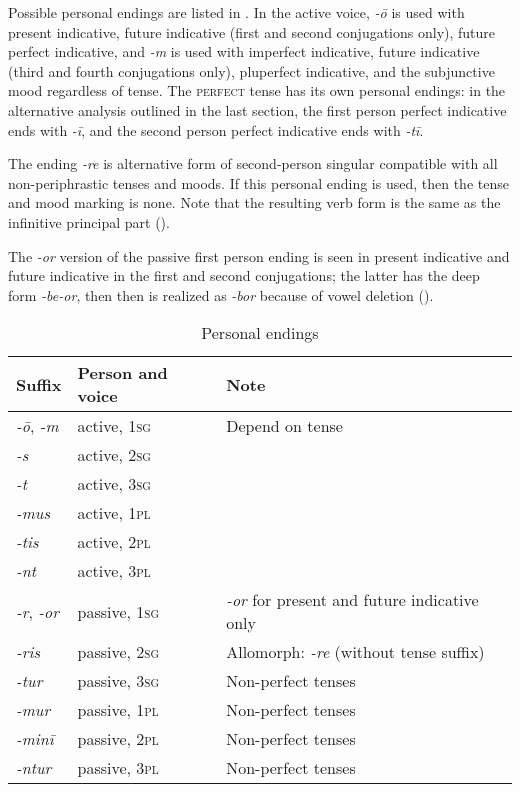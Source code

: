 \documentclass[a4paper, oneside, 12pt]{report}
\newcommand{\form}[1]{\emph{#1}}
\newcommand*{\category}[1]{\textsc{#1}}
\begin{document}
Possible personal endings are listed in .
In the active voice, 
\form{-\={o}} is used with present indicative, 
future indicative (first and second conjugations only), 
future perfect indicative,
and \form{-m} is used with imperfect indicative, 
future indicative (third and fourth conjugations only),
pluperfect indicative,
and the subjunctive mood regardless of tense.
The \category{perfect} tense has its own personal endings:
in the alternative analysis outlined in the last section,
the first person perfect indicative ends with \form{-ī},
and the second person perfect indicative ends with \form{-tī}.

The ending \form{-re} is alternative form of second-person singular compatible 
with all non-periphrastic tenses and moods.
If this personal ending is used, then the tense and mood marking is none.
Note that the resulting verb form is the same as the infinitive principal part
().

The \form{-or} version of the passive first person ending 
is seen in present indicative and future indicative
in the first and second conjugations;
the latter has the deep form \form{-be-or},
then then is realized as \form{-bor} because of vowel deletion 
().

\begin{table}[H]
    \caption{Personal endings}
    \label{tbl:personal-ending}
    \centering
    \begin{tabular}{lll}
        \toprule
        Suffix & Person and voice & Note \\
        \midrule
        \form{-\={o}}, \form{-m} & active, \category{1sg} & Depend on tense \\ 
        \form{-s}                & active, \category{2sg} & \\ 
        \form{-t}                & active, \category{3sg} & \\ 
        \form{-mus}              & active, \category{1pl} & \\
        \form{-tis}              & active, \category{2pl} & \\
        \form{-nt}               & active, \category{3pl} & \\ \midrule 
        \form{-r}, \form{-or}    & passive, \category{1sg} & \form{-or} for present and future indicative only \\ 
        \form{-ris}              & passive, \category{2sg} & Allomorph: \form{-re} (without tense suffix) \\
        \form{-tur}              & passive, \category{3sg} & Non-perfect tenses \\
        \form{-mur}              & passive, \category{1pl} & Non-perfect tenses \\
        \form{-minī}             & passive, \category{2pl} & Non-perfect tenses \\
        \form{-ntur}             & passive, \category{3pl} & Non-perfect tenses \\ \bottomrule
    \end{tabular}
\end{table}
\end{document}
